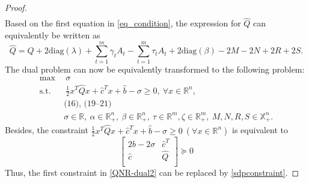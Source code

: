 \documentclass[10pt,a4paper]{amsart}
\begin{document}
\begin{proof}
\begin{align}
	\end{align}
	Based on the first equation in \eqref{eq_condition}, the expression for $\hat{Q}$ can equivalently be written as
	\begin{equation}
		\hat{Q}=Q+2\textrm{diag}(\lambda)+\sum_{t=1}^m\gamma_t A_t-\sum_{t=1}^m \tau_t A_t +2\textrm{diag}(\beta)-2M-2N+2R+2S.
	\end{equation}
	The dual problem can now be equivalently transformed to the following problem:
	\begin{equation}\label{QNR-dual2}
		\begin{aligned}
			\max ~&~ \sigma \\
			\mbox{s.t.} ~&~\frac{1}{2}x^T \hat{Q} x + \hat{c}^T x + \hat{b}-\sigma \geq 0,~\forall x\in\mathbb{R}^n,\\
			&\textrm{(16), (19--21)}\\
			&\sigma\in\mathbb{R},~\alpha\in \mathbb{R}^n_+,~\beta\in \mathbb{R}^n_+,~\tau\in \mathbb{R}^m,\zeta\in \mathbb{R}^m_+,~M,N,R,S\in\mathbb{X}_+^n.
		\end{aligned}
	\end{equation}
	Besides, the constraint $\frac{1}{2}x^T \hat{Q} x + \hat{c}^T x + \hat{b}-\sigma \geq 0~(\forall x\in\mathbb{R}^n)$ is equivalent to
	\begin{equation}\label{sdpconstraint}
		\begin{bmatrix}
			2\hat{b}-2\sigma &\hat{c}^T\\
			\hat{c} ~&\hat{Q} \\
		\end{bmatrix}\succeq 0
	\end{equation}
	Thus, the first constraint in \eqref{QNR-dual2} can be replaced by \eqref{sdpconstraint}.
	

\end{proof}
\end{document}
